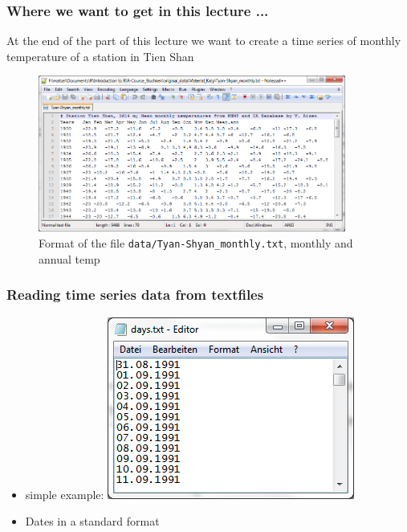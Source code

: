 \documentclass[xcolor=table, xcolor=dvipsnames]{beamer}\usepackage[]{graphicx}\usepackage[]{color}
\begin{document}
\begin{frame}\frametitle{Where we want to get in this lecture ...}
At the end of the part of this lecture we want to create a time series of monthly temperature of a station in Tien Shan
\begin{figure}[h]
\includegraphics[width=0.9\textwidth]{./externalfig/SS_Tyan-Shyan_monthly_txt.png}
\caption{Format of the file \texttt{data/Tyan-Shyan\_monthly.txt}, monthly and annual temp}
\end{figure}
\end{frame}





\begin{frame}\frametitle{Reading time series data from textfiles}
  \begin{itemize}
 \item simple example: \includegraphics[scale=0.4]{./externalfig/SS_days.png}
 \item Dates in a standard format
 \end{itemize}
\end{frame}
\end{document}
